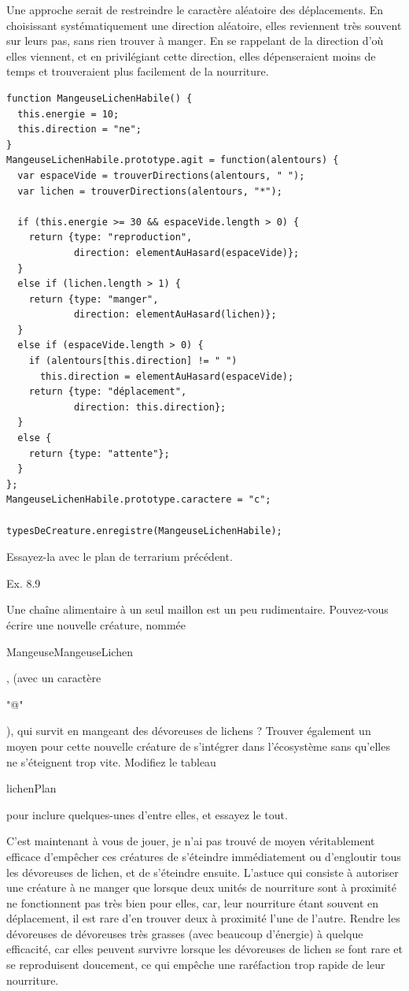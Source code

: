 \documentclass{FramateX}
\renewcommand{\texttt}[1]{\begin{sffamily}{#1}\end{sffamily}}
\begin{document}
Une approche serait de restreindre le caractère aléatoire des
déplacements. En choisissant systématiquement une direction aléatoire,
elles reviennent très souvent sur leurs pas, sans rien trouver à manger.
En se rappelant de la direction d'où elles viennent, et en privilégiant
cette direction, elles dépenseraient moins de temps et trouveraient plus
facilement de la nourriture.

\begin{lstlisting}
function MangeuseLichenHabile() {
  this.energie = 10;
  this.direction = "ne";
}
MangeuseLichenHabile.prototype.agit = function(alentours) {
  var espaceVide = trouverDirections(alentours, " ");
  var lichen = trouverDirections(alentours, "*");

  if (this.energie >= 30 && espaceVide.length > 0) {
    return {type: "reproduction",
            direction: elementAuHasard(espaceVide)};
  }
  else if (lichen.length > 1) {
    return {type: "manger",
            direction: elementAuHasard(lichen)};
  }
  else if (espaceVide.length > 0) {
    if (alentours[this.direction] != " ")
      this.direction = elementAuHasard(espaceVide);
    return {type: "déplacement",
            direction: this.direction};
  }
  else {
    return {type: "attente"};
  }
};
MangeuseLichenHabile.prototype.caractere = "c";

typesDeCreature.enregistre(MangeuseLichenHabile);
\end{lstlisting}
Essayez-la avec le plan de terrarium précédent.

\begin{center}\end{center}

Ex. 8.9

Une chaîne alimentaire à un seul maillon est un peu rudimentaire.
Pouvez-vous écrire une nouvelle créature, nommée
\texttt{MangeuseMangeuseLichen}, (avec un caractère \texttt{"@"}), qui
survit en mangeant des dévoreuses de lichens ? Trouver également un
moyen pour cette nouvelle créature de s'intégrer dans l'écosystème sans
qu'elles ne s'éteignent trop vite. Modifiez le tableau
\texttt{lichenPlan} pour inclure quelques-unes d'entre elles, et essayez
le tout.

C'est maintenant à vous de jouer, je n'ai pas trouvé de moyen
véritablement efficace d'empêcher ces créatures de s'éteindre
immédiatement ou d'engloutir tous les dévoreuses de lichen, et de
s'éteindre ensuite. L'astuce qui consiste à autoriser une créature à ne
manger que lorsque deux unités de nourriture sont à proximité ne
fonctionnent pas très bien pour elles, car, leur nourriture étant
souvent en déplacement, il est rare d'en trouver deux à proximité l'une
de l'autre. Rendre les dévoreuses de dévoreuses très grasses (avec
beaucoup d'énergie) à quelque efficacité, car elles peuvent survivre
lorsque les dévoreuses de lichen se font rare et se reproduisent
doucement, ce qui empêche une raréfaction trop rapide de leur
nourriture.
\end{document}
